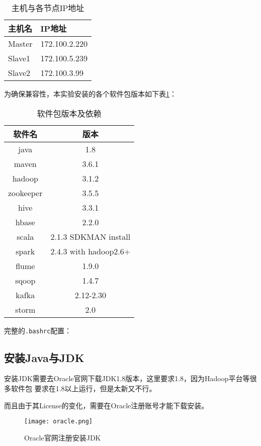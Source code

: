 \begin{table}[htbp]
	\centering
	\caption{主机与各节点IP地址}
	\begin{tabular}{p{2cm}|p{3cm}}
		\toprule
		主机名 & IP地址 \\ \midrule
		Master & 172.100.2.220 \\ \hline
		Slave1 & 172.100.5.239 \\ \hline
		Slave2 & 172.100.3.99 \\ \bottomrule
	\end{tabular}
\end{table}
为确保兼容性，本实验安装的各个软件包版本如下表\ref{tab:env_soft}：
\begin{table}
	\centering
	\caption{软件包版本及依赖}
	\begin{tabular}{c|c}
		\toprule
		软件名 & 版本 \\
		\midrule
		java 	& 1.8 \\ \hline
		maven 	& 3.6.1 \\ \hline
		hadoop 	& 3.1.2 \\ \hline
		zookeeper 	& 3.5.5 \\ \hline
		hive 	& 3.3.1 \\ \hline
		hbase 	& 2.2.0 \\ \hline
		scala 	& 2.1.3 SDKMAN install \\ \hline
		spark 	& 2.4.3 with hadoop2.6+\\  \hline
		flume 	& 1.9.0 \\  \hline
		sqoop 	& 1.4.7 \\ \hline
		kafka 	& 2.12-2.30\\ \hline
		storm 	& 2.0\\
		\bottomrule
	\end{tabular}
	\label{tab:env_soft}
\end{table}
完整的\lstinline{.bashrc}配置：


\subsection{安装Java与JDK}
安装JDK需要去Oracle官网下载JDK1.8版本，这里要求1.8，因为Hadoop平台等很多软件包
要求在1.8以上运行，但是太新又不行。

而且由于其License的变化，需要在Oracle注册账号才能下载安装。
\begin{figure}[htbp]
	\centering
	\texttt{[image: oracle.png]}
	\caption{Oracle官网注册安装JDK}
	\label{fig:install_jdk}
\end{figure}


